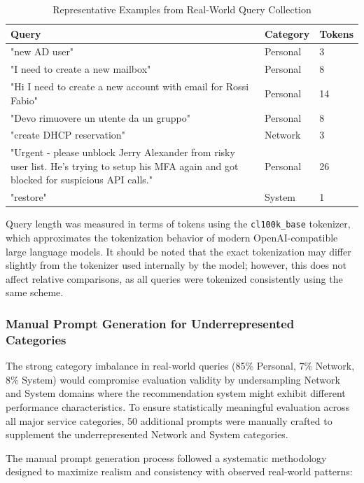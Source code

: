 \begin{table}[htbp]
\centering
\small
\begin{tabular}{p{}p{}p{}}
\toprule
\textbf{Query} & \textbf{Category} & \textbf{Tokens} \\
\midrule
"new AD user" & Personal & 3 \\
"I need to create a new mailbox" & Personal & 8 \\
"Hi I need to create a new account with email for Rossi Fabio" & Personal & 14 \\
"Devo rimuovere un utente da un gruppo" & Personal & 8 \\
"create DHCP reservation" & Network & 3 \\
"Urgent - please unblock Jerry Alexander from risky user list. He's trying to setup his MFA again and got blocked for suspicious API calls." & Personal & 26 \\
"restore" & System & 1 \\
\bottomrule
\end{tabular}
\caption{Representative Examples from Real-World Query Collection}
\label{tab:real_world_examples}
\end{table}

Query length was measured in terms of tokens using the \texttt{cl100k\_base} tokenizer, which approximates the tokenization behavior of modern OpenAI-compatible large language models.
It should be noted that the exact tokenization may differ slightly from the tokenizer used internally by the model; however, this does not affect relative comparisons, as all queries were tokenized consistently using the same scheme.

\subsubsection{Manual Prompt Generation for Underrepresented Categories}

The strong category imbalance in real-world queries (85\% Personal, 7\% Network, 8\% System) would compromise evaluation validity by undersampling Network and System domains where the recommendation system might exhibit different performance characteristics. To ensure statistically meaningful evaluation across all major service categories, 50 additional prompts were manually crafted to supplement the underrepresented Network and System categories.

The manual prompt generation process followed a systematic methodology designed to maximize realism and consistency with observed real-world patterns:

